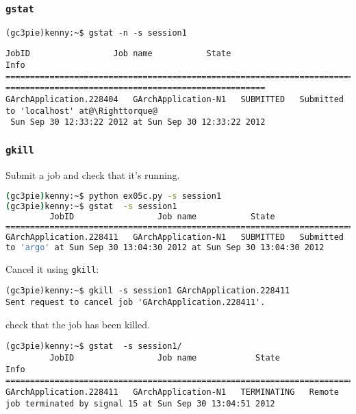 \documentclass[english,serif,mathserif,xcolor=pdftex,dvipsnames,table]{beamer}
\begin{document}
\begin{frame}[fragile]
  \frametitle{\texttt{gstat}}
  \begin{lstlisting}
(gc3pie)kenny:~$ gstat -n -s session1
  \end{lstlisting}
  \begin{lstlisting}[basicstyle=\tt\tiny]
         JobID                 Job name           State                                           Info                                       
=======================================================================================@\Righttorque@
=====================================================
GArchApplication.228404   GArchApplication-N1   SUBMITTED   Submitted to 'localhost' at@\Righttorque@
 Sun Sep 30 12:33:22 2012 at Sun Sep 30 12:33:22 2012 
  \end{lstlisting}%
\end{frame}

\begin{frame}[fragile]
  \frametitle{\texttt{gkill}}
Submit a job and check that it's running.
\begin{lstlisting}[language=sh,basicstyle=\tt\tiny]
(gc3pie)kenny:~$ python ex05c.py -s session1
(gc3pie)kenny:~$ gstat  -s session1
         JobID                 Job name           State                                        Info                                     
=======================================================================================================================================
GArchApplication.228411   GArchApplication-N1   SUBMITTED   Submitted
to 'argo' at Sun Sep 30 13:04:30 2012 at Sun Sep 30 13:04:30 2012 
\end{lstlisting}

Cancel it using \lstinline|gkill|:
\begin{lstlisting}[basicstyle=\tt\tiny]
(gc3pie)kenny:~$ gkill -s session1 GArchApplication.228411
Sent request to cancel job 'GArchApplication.228411'.
\end{lstlisting}%

check that the job has been killed.

\begin{lstlisting}[basicstyle=\tt\tiny]
(gc3pie)kenny:~$ gstat  -s session1/
         JobID                 Job name            State                                   Info                              
============================================================================================================================
GArchApplication.228411   GArchApplication-N1   TERMINATING   Remote job terminated by signal 15 at Sun Sep 30 13:04:51 2012 
\end{lstlisting}%
\end{frame}
\end{document}

